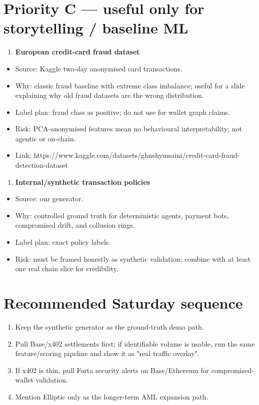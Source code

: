 \documentclass[11pt]{article}
\begin{document}
\section{Priority C --- useful only for storytelling / baseline ML}
\begin{enumerate}
  \item \textbf{European credit-card fraud dataset}
\end{enumerate}
\begin{itemize}
  \item Source: Kaggle two-day anonymised card transactions.
  \item Why: classic fraud baseline with extreme class imbalance; useful for a slide explaining why old fraud datasets are the wrong distribution.
  \item Label plan: fraud class as positive; do not use for wallet graph claims.
  \item Risk: PCA-anonymised features mean no behavioural interpretability; not agentic or on-chain.
  \item Link: https://www.kaggle.com/datasets/ghnshymsaini/credit-card-fraud-detection-dataset
\end{itemize}
\begin{enumerate}
  \item \textbf{Internal/synthetic transaction policies}
\end{enumerate}
\begin{itemize}
  \item Source: our generator.
  \item Why: controlled ground truth for deterministic agents, payment bots, compromised drift, and collusion rings.
  \item Label plan: exact policy labels.
  \item Risk: must be framed honestly as synthetic validation; combine with at least one real chain slice for credibility.
\end{itemize}
\section{Recommended Saturday sequence}
\begin{enumerate}
  \item Keep the synthetic generator as the ground-truth demo path.
  \item Pull Base/x402 settlements first; if identifiable volume is usable, run the same feature/scoring pipeline and show it as "real traffic overlay".
  \item If x402 is thin, pull Forta security alerts on Base/Ethereum for compromised-wallet validation.
  \item Mention Elliptic only as the longer-term AML expansion path.
\end{enumerate}
\end{document}
